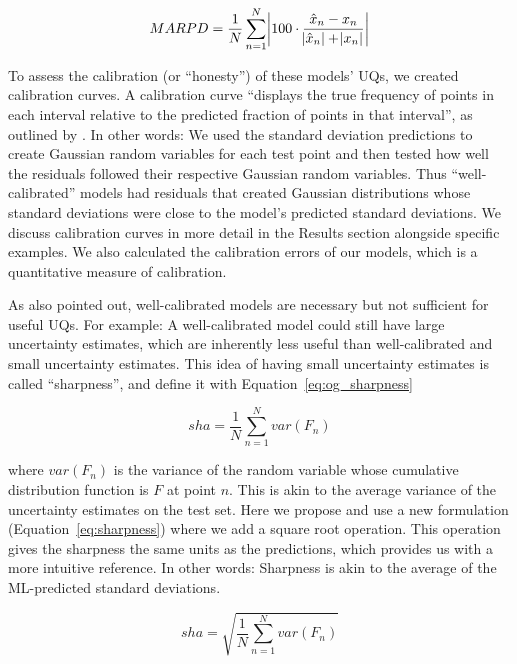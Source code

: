 \documentclass[]{achemso}
\begin{document}
\begin{equation}\label{eq:marpd}
    MARPD = \frac{1}{N} \sum_{n=1}^{N} \abs{100 \cdot \frac{\hat{x}_n - x_n}{\abs{\hat{x}_n} + \abs{x_n}}}
\end{equation}

To assess the calibration (or ``honesty'') of these models' UQs, we created calibration curves.
A calibration curve ``displays the true frequency of points in each interval relative to the predicted fraction of points in that interval'', as outlined by \citet{Kuleshov2018}.
In other words:  We used the standard deviation predictions to create Gaussian random variables for each test point and then tested how well the residuals followed their respective Gaussian random variables.
Thus ``well-calibrated'' models had residuals that created Gaussian distributions whose standard deviations were close to the model's predicted standard deviations.
We discuss calibration curves in more detail in the Results section alongside specific examples.
We also calculated the calibration errors\cite{Kuleshov2018} of our models, which is a quantitative measure of calibration.

As \citet{Kuleshov2018} also pointed out, well-calibrated models are necessary but not sufficient for useful \gls{UQ}s.
For example:  A well-calibrated model could still have large uncertainty estimates, which are inherently less useful than well-calibrated and small uncertainty estimates.
This idea of having small uncertainty estimates is called ``sharpness'', and \citet{Kuleshov2018} define it with Equation~\ref{eq:og_sharpness}

\begin{equation}\label{eq:og_sharpness}
    sha = \frac{1}{N} \sum_{n=1}^{N} var(F_n)
\end{equation}

\noindent where $var(F_n)$ is the variance of the random variable whose cumulative distribution function is $F$ at point $n$.
This is akin to the average variance of the uncertainty estimates on the test set.
Here we propose and use a new formulation (Equation~\ref{eq:sharpness}) where we add a square root operation.
This operation gives the sharpness the same units as the predictions, which provides us with a more intuitive reference.
In other words:  Sharpness is akin to the average of the \gls{ML}-predicted standard deviations.

\begin{equation}\label{eq:sharpness}
    sha = \sqrt{\frac{1}{N} \sum_{n=1}^{N} var(F_n)}
\end{equation}
\end{document}
